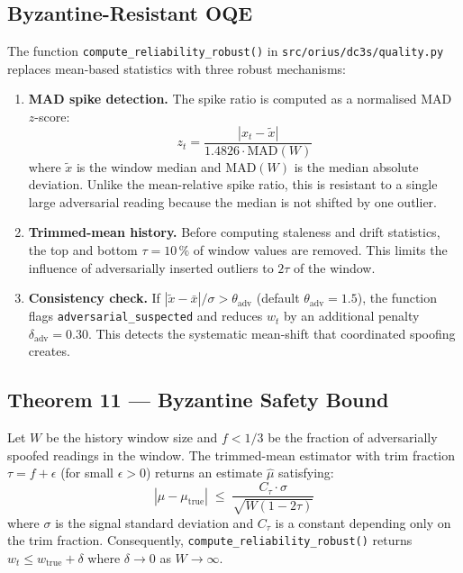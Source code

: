 \subsection{Byzantine-Resistant OQE}

The function \texttt{compute\_reliability\_robust()} in
\texttt{src/orius/dc3s/quality.py} replaces mean-based statistics with
three robust mechanisms:

\begin{enumerate}
  \item \textbf{MAD spike detection.}
        The spike ratio is computed as a normalised MAD $z$-score:
        \[
          z_t = \frac{|x_t - \tilde{x}|}{1.4826 \cdot \mathrm{MAD}(W)}
        \]
        where $\tilde{x}$ is the window median and $\mathrm{MAD}(W)$ is the
        median absolute deviation.  Unlike the mean-relative spike ratio,
        this is resistant to a single large adversarial reading because the
        median is not shifted by one outlier.

  \item \textbf{Trimmed-mean history.}
        Before computing staleness and drift statistics, the top and bottom
        $\tau = 10\,\%$ of window values are removed.  This limits the
        influence of adversarially inserted outliers to $2\tau$ of the window.

  \item \textbf{Consistency check.}
        If $|\tilde{x} - \bar{x}| / \sigma > \theta_\text{adv}$
        (default $\theta_\text{adv} = 1.5$), the function flags
        \texttt{adversarial\_suspected} and reduces $w_t$ by an additional
        penalty $\delta_\text{adv} = 0.30$.  This detects the systematic
        mean-shift that coordinated spoofing creates.
\end{enumerate}

\subsection{Theorem 11 — Byzantine Safety Bound}

\begin{theorem}\label{thm:byzantine_safety}
Let $W$ be the history window size and $f < 1/3$ be the fraction of
adversarially spoofed readings in the window.
The trimmed-mean estimator with trim fraction $\tau = f + \epsilon$
(for small $\epsilon > 0$) returns an estimate $\hat{\mu}$ satisfying:
\[
  |\hat{\mu} - \mu_\mathrm{true}| \;\leq\; \frac{C_\tau \cdot \sigma}{\sqrt{W(1-2\tau)}}
\]
where $\sigma$ is the signal standard deviation and $C_\tau$ is a constant
depending only on the trim fraction.
Consequently, \texttt{compute\_reliability\_robust()} returns
$w_t \leq w_\mathrm{true} + \delta$ where $\delta \to 0$ as $W \to \infty$.
\end{theorem}

